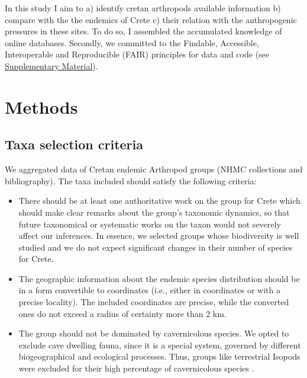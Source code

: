 In this study I aim to a) identify cretan arthropods available information
b) compare with the the endemics of Crete
c) their relation with the anthropogenic pressures in these sites.
To do so, I assembled the accumulated knowledge of 
online databases.
Secondly, we committed to the Findable, Accessible, Interoperable and Reproducible (FAIR) principles \parencite{wilkinson2016the-fair}
for data and code (see \href{https://doi.org/10.5281/zenodo.10635645}{Supplementary Material}).


\section{Methods}
\label{sec:arthropods-method}
   
    \subsection{Taxa selection criteria}
    \label{subsec:arthropods-taxa-selection}

We aggregated data of Cretan endemic Arthropod groups (NHMC collections and bibliography). The taxa included should satisfy the following criteria:
\begin{itemize}

    \item There should be at least one authoritative work on the group for Crete which
should make clear remarks about the group’s taxonomic dynamics, so that future
taxonomical or systematic works on the taxon would not severely affect our inferences.
In essence, we selected groups whose biodiversity is well studied and we do not
expect significant changes in their number of species for Crete. 

    \item The geographic information about the endemic species distribution should be in
a form convertible to coordinates (i.e., either in coordinates or with a
precise locality). The included coordinates are precise, while the converted
ones do not exceed a radius of certainty more than 2 km.

    \item The group should not be dominated by cavernicolous species. We opted to exclude
cave dwelling fauna, since it is a special system, governed by different
biogeographical and ecological processes. Thus, groups like terrestrial Isopods
were excluded for their high percentage of cavernicolous species \parencite{schmalfuss2004the-terrestrial,sfendourakis2018}.

\end{itemize}

